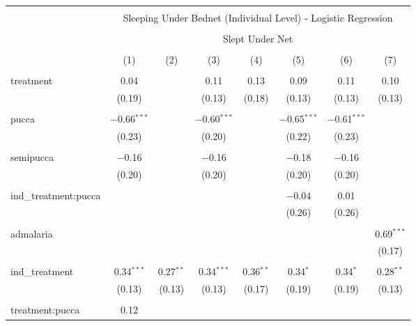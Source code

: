 
\begin{table}[!htbp] \centering 
  \caption{} 
  \label{tbl:Sleeping Under Bednet (Individual Level) - Logistic Regression} 
\small 
\begin{tabular}{@{\extracolsep{5pt}}lccccccc} 
\\[-1.8ex]\hline 
\hline \\[-1.8ex] 
 & \multicolumn{7}{c}{Sleeping Under Bednet (Individual Level) - Logistic Regression} \\ 
\cline{2-8} 
\\[-1.8ex] & \multicolumn{7}{c}{Slept Under Net} \\ 
\\[-1.8ex] & (1) & (2) & (3) & (4) & (5) & (6) & (7)\\ 
\hline \\[-1.8ex] 
 treatment & 0.04 &  & 0.11 & 0.13 & 0.09 & 0.11 & 0.10 \\ 
  & (0.19) &  & (0.13) & (0.18) & (0.13) & (0.13) & (0.13) \\ 
  & & & & & & & \\ 
 pucca & $-$0.66$^{***}$ &  & $-$0.60$^{***}$ &  & $-$0.65$^{***}$ & $-$0.61$^{***}$ &  \\ 
  & (0.23) &  & (0.20) &  & (0.22) & (0.23) &  \\ 
  & & & & & & & \\ 
 semipucca & $-$0.16 &  & $-$0.16 &  & $-$0.18 & $-$0.16 &  \\ 
  & (0.20) &  & (0.20) &  & (0.20) & (0.20) &  \\ 
  & & & & & & & \\ 
 ind\_treatment:pucca &  &  &  &  & $-$0.04 & 0.01 &  \\ 
  &  &  &  &  & (0.26) & (0.26) &  \\ 
  & & & & & & & \\ 
 admalaria &  &  &  &  &  &  & 0.69$^{***}$ \\ 
  &  &  &  &  &  &  & (0.17) \\ 
  & & & & & & & \\ 
 ind\_treatment & 0.34$^{***}$ & 0.27$^{**}$ & 0.34$^{***}$ & 0.36$^{**}$ & 0.34$^{*}$ & 0.34$^{*}$ & 0.28$^{**}$ \\ 
  & (0.13) & (0.13) & (0.13) & (0.17) & (0.19) & (0.19) & (0.13) \\ 
  & & & & & & & \\ 
 treatment:pucca & 0.12 &  &  &  &  &  &  \\ 

\end{tabular}
\end{table}
